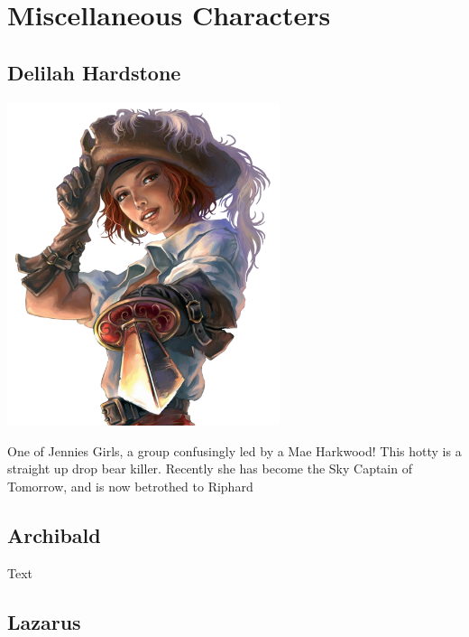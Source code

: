 \section{Miscellaneous Characters}




\subsection*{Delilah Hardstone} 

\begin{center}
\includegraphics[width=80mm]{./content/img/delilah.png}
\begin{figure}[h]
\end{figure}
\end{center}

\noindent 

One of Jennies Girls, a group confusingly led by a Mae Harkwood! This hotty is a straight up drop bear killer. Recently she has become the Sky Captain of Tomorrow, and is now betrothed to Riphard

\smallskip

\subsection*{Archibald} 

\noindent 

Text

\smallskip

\subsection*{Lazarus} 

